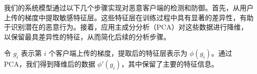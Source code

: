 \documentclass[conference]{IEEEtran}
\begin{document}


我们的系统模型通过以下几个步骤实现对恶意客户端的检测和防御。首先，从用户上传的梯度中提取敏感特征层。这些特征层在训练过程中具有显著的差异性，有助于识别潜在的恶意行为。接着，应用主成分分析（PCA）对这些数据进行降维，以保留最具差异性的特征，从而简化后续的分析步骤。

令 $g_i$ 表示第 $i$ 个客户端上传的梯度，提取后的特征层表示为 $\phi(g_i)$。通过PCA，我们得到降维后的数据 $\phi'(g_i)$，其中保留了主要的特征信息。
\end{document}
